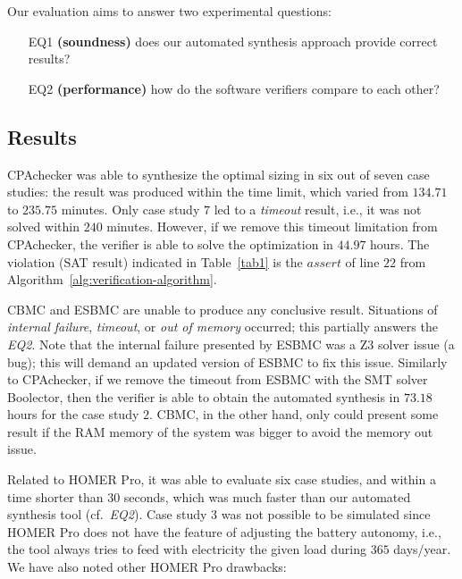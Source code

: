 \documentclass[review]{elsarticle}
\begin{document}
Our evaluation aims to answer two experimental questions: 

\begin{enumerate}

\item[EQ1] \textbf{(soundness)} does our automated synthesis approach provide correct results?

\item[EQ2] \textbf{(performance)} how do the software verifiers compare to each other?

\end{enumerate}

\subsection{Results}  

CPAchecker was able to synthesize the optimal sizing in six 
out of seven case studies: the result was produced within 
the time limit, which varied from $134.71$ to $235.75$ minutes. 
Only case study $7$ led to a \textit{timeout} result, i.e., 
it was not solved within $240$ minutes. However, if we remove 
this timeout limitation from CPAchecker, the verifier is 
able to solve the optimization in $44.97$ hours. 
The violation (SAT result) indicated in Table~\ref{tab1} 
is the $assert$ of line $22$ from Algorithm~\ref{alg:verification-algorithm}. %

CBMC and ESBMC are unable to produce any conclusive result. 
Situations of \textit{internal failure}, \textit{timeout}, 
or \textit{out of memory} occurred; this partially answers 
the \textit{EQ2}. Note that the internal failure presented 
by ESBMC was a Z3 solver issue (a bug); this will demand 
an updated version of ESBMC to fix this issue. Similarly to CPAchecker, 
if we remove the timeout from ESBMC with the SMT solver Boolector, 
then the verifier is able to obtain the automated synthesis 
in $73.18$ hours for the case study $2$. CBMC, in the other hand, only could present some result if the RAM memory of the system was bigger to avoid the memory out issue.

Related to HOMER Pro, it was able to evaluate six case studies, 
and within a time shorter than $30$ seconds, which was much 
faster than our automated synthesis tool (cf.~\textit{EQ2}). 
Case study $3$ was not possible to be simulated since HOMER Pro 
does not have the feature of adjusting the battery autonomy, i.e., 
the tool always tries to feed with electricity the given load 
during $365$ days/year. We have also noted other HOMER Pro drawbacks:
\end{document}
